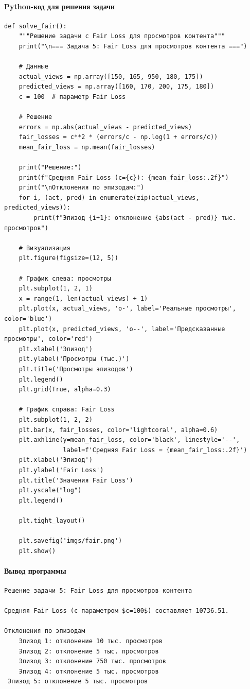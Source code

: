 \documentclass[12pt]{article}
\theoremstyle{definition}
\theoremstyle{definition}
\theoremstyle{definition}
\theoremstyle{remark}
\theoremstyle{remark}
\begin{document}
\paragraph*{Python-код для решения задачи}
\begin{verbatim}
def solve_fair():
    """Решение задачи с Fair Loss для просмотров контента"""
    print("\n=== Задача 5: Fair Loss для просмотров контента ===")
    
    # Данные
    actual_views = np.array([150, 165, 950, 180, 175])
    predicted_views = np.array([160, 170, 200, 175, 180])
    c = 100  # параметр Fair Loss
    
    # Решение
    errors = np.abs(actual_views - predicted_views)
    fair_losses = c**2 * (errors/c - np.log(1 + errors/c))
    mean_fair_loss = np.mean(fair_losses)
    
    print("Решение:")
    print(f"Средняя Fair Loss (c={c}): {mean_fair_loss:.2f}")
    print("\nОтклонения по эпизодам:")
    for i, (act, pred) in enumerate(zip(actual_views, predicted_views)):
        print(f"Эпизод {i+1}: отклонение {abs(act - pred)} тыс. просмотров")
    
    # Визуализация
    plt.figure(figsize=(12, 5))
    
    # График слева: просмотры
    plt.subplot(1, 2, 1)
    x = range(1, len(actual_views) + 1)
    plt.plot(x, actual_views, 'o-', label='Реальные просмотры', color='blue')
    plt.plot(x, predicted_views, 'o--', label='Предсказанные просмотры', color='red')
    plt.xlabel('Эпизод')
    plt.ylabel('Просмотры (тыс.)')
    plt.title('Просмотры эпизодов')
    plt.legend()
    plt.grid(True, alpha=0.3)
    
    # График справа: Fair Loss
    plt.subplot(1, 2, 2)
    plt.bar(x, fair_losses, color='lightcoral', alpha=0.6)
    plt.axhline(y=mean_fair_loss, color='black', linestyle='--', 
                label=f'Средняя Fair Loss = {mean_fair_loss:.2f}')
    plt.xlabel('Эпизод')
    plt.ylabel('Fair Loss')
    plt.title('Значения Fair Loss')
    plt.yscale("log")
    plt.legend()
    
    plt.tight_layout()
    
    plt.savefig('imgs/fair.png')
    plt.show()
\end{verbatim}
\paragraph{Вывод программы}
\begin{verbatim}
Решение задачи 5: Fair Loss для просмотров контента

Средняя Fair Loss (с параметром $c=100$) составляет 10736.51.

Отклонения по эпизодам
    Эпизод 1: отклонение 10 тыс. просмотров
    Эпизод 2: отклонение 5 тыс. просмотров
    Эпизод 3: отклонение 750 тыс. просмотров
    Эпизод 4: отклонение 5 тыс. просмотров
 Эпизод 5: отклонение 5 тыс. просмотров
\end{verbatim}
\end{document}
